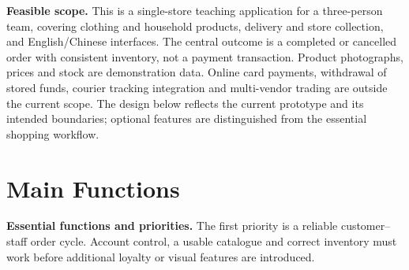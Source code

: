 \documentclass[11pt,a4paper]{article}
\begin{document}
\textbf{Feasible scope.} This is a single-store teaching application for a three-person team, covering clothing and household products, delivery and store collection, and English/Chinese interfaces. The central outcome is a completed or cancelled order with consistent inventory, not a payment transaction. Product photographs, prices and stock are demonstration data. Online card payments, withdrawal of stored funds, courier tracking integration and multi-vendor trading are outside the current scope. The design below reflects the current prototype and its intended boundaries; optional features are distinguished from the essential shopping workflow.

\newpage
\section{Main Functions}
\textbf{Essential functions and priorities.} The first priority is a reliable customer--staff order cycle. Account control, a usable catalogue and correct inventory must work before additional loyalty or visual features are introduced.
\end{document}
